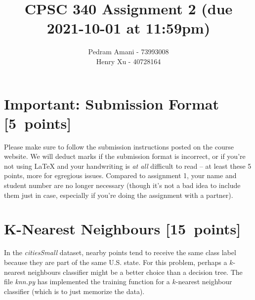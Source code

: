 \documentclass{article}
\newcommand{\blu}[1]{{\textcolor{blu}{#1}}}
\let\ask\blu
\newcommand\pts[1]{\textcolor{pointscolour}{[#1~points]}}
\begin{document}
    \title{CPSC 340 Assignment 2 (due 2021-10-01 at 11:59pm)}
    \author{
        Pedram Amani - 73993008\\
        Henry Xu - 40728164
    }
    \date{}
    \maketitle

    \section*{Important: Submission Format \pts{5}}

    Please make sure to follow the submission instructions posted on the course website.
    \ask{We will deduct marks if the submission format is incorrect, or if you're not using \LaTeX{} and your handwriting is \emph{at all} difficult to read} -- at least these 5 points, more for egregious issues.
    Compared to assignment 1, your name and student number are no longer necessary (though it's not a bad idea to include them just in case, especially if you're doing the assignment with a partner).


    \section{K-Nearest Neighbours \pts{15}}

    In the \emph{citiesSmall} dataset, nearby points tend to receive the same class label because they are part of the same U.S. state. For this problem, perhaps a $k$-nearest neighbours classifier might be a better choice than a decision tree. The file \emph{knn.py} has implemented the training function for a $k$-nearest neighbour classifier (which is to just memorize the data).
\end{document}
